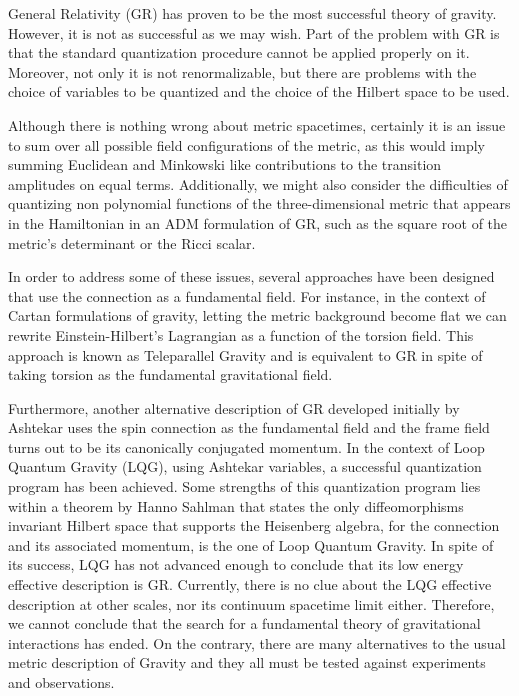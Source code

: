 \documentclass[twocolumn,
  showpacs,showkeys,prd,superscriptaddress]{revtex4-1}
\begin{document}
General Relativity (GR) has proven to be the most successful theory of gravity.  However,  it is not as successful as we may wish. Part of the problem with GR is that the standard quantization procedure cannot be applied  properly on it. Moreover, not only it is not renormalizable, but there are  problems with the choice of variables to be quantized and the choice of the Hilbert space to be used. 

Although there is nothing wrong about metric spacetimes,  certainly it is an issue to sum over all possible field configurations of the metric, as this would imply summing Euclidean and Minkowski like contributions to the transition amplitudes on equal terms. Additionally, we might also consider the difficulties of  quantizing  non polynomial functions of the three-dimensional metric that appears in the Hamiltonian in an ADM formulation of GR, such as the square root of the metric's determinant or the Ricci scalar.

In order to address some of these issues, several approaches have been designed that use the connection as a fundamental field. For instance, in the context of Cartan formulations of gravity, letting the metric background become flat we can rewrite Einstein-Hilbert's Lagrangian as a function of the torsion field. This approach is known as Teleparallel Gravity and is equivalent to GR in spite of taking torsion as the fundamental gravitational field.

Furthermore, another alternative description of GR developed initially by Ashtekar uses the spin connection as the fundamental field and the frame field turns out to be its canonically conjugated momentum. In the context of Loop Quantum Gravity (LQG), using Ashtekar variables, a successful quantization program has been achieved. Some  strengths of this quantization program lies within a theorem by Hanno Sahlman that states the only diffeomorphisms invariant Hilbert space that supports the Heisenberg algebra, for the connection and its associated momentum, is the one of Loop Quantum Gravity. In spite of its success, LQG has not advanced enough to conclude that its low energy effective description is GR. Currently, there is no clue about the LQG effective description at other scales,  nor its continuum spacetime limit either. Therefore, we cannot conclude that the search for a fundamental theory of gravitational interactions has ended. On the contrary, there are many alternatives to the usual metric description of Gravity and they all must be tested against experiments and observations.
\end{document}
